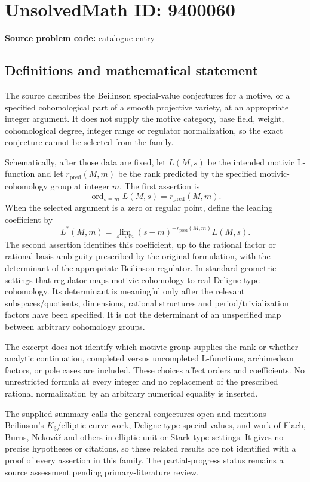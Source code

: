 \documentclass[11pt]{article}
\begin{document}
\section*{UnsolvedMath ID: 9400060}
\textbf{Source problem code:} catalogue entry
\subsection{Definitions and mathematical statement}
The source describes the Beilinson special-value conjectures for a motive, or a specified cohomological part of a smooth projective variety, at an appropriate integer argument. It does not supply the motive category, base field, weight, cohomological degree, integer range or regulator normalization, so the exact conjecture cannot be selected from the family.

Schematically, after those data are fixed, let \(L(M,s)\) be the intended motivic L-function and let \(r_{\mathrm{pred}}(M,m)\) be the rank predicted by the specified motivic-cohomology group at integer \(m\). The first assertion is
\[
 \operatorname{ord}_{s=m}L(M,s)=r_{\mathrm{pred}}(M,m).
\]
When the selected argument is a zero or regular point, define the leading coefficient by
\[
 L^*(M,m)=\lim_{s\to m}(s-m)^{-r_{\mathrm{pred}}(M,m)}L(M,s).
\]
The second assertion identifies this coefficient, up to the rational factor or rational-basis ambiguity prescribed by the original formulation, with the determinant of the appropriate Beilinson regulator. In standard geometric settings that regulator maps motivic cohomology to real Deligne-type cohomology. Its determinant is meaningful only after the relevant subspaces/quotients, dimensions, rational structures and period/trivialization factors have been specified. It is not the determinant of an unspecified map between arbitrary cohomology groups.

The excerpt does not identify which motivic group supplies the rank or whether analytic continuation, completed versus uncompleted L-functions, archimedean factors, or pole cases are included. These choices affect orders and coefficients. No unrestricted formula at every integer and no replacement of the prescribed rational normalization by an arbitrary numerical equality is inserted.

The supplied summary calls the general conjectures open and mentions Beilinson's \(K_3\)/elliptic-curve work, Deligne-type special values, and work of Flach, Burns, Nekov\'a\v{r} and others in elliptic-unit or Stark-type settings. It gives no precise hypotheses or citations, so these related results are not identified with a proof of every assertion in this family. The partial-progress status remains a source assessment pending primary-literature review.
\end{document}
